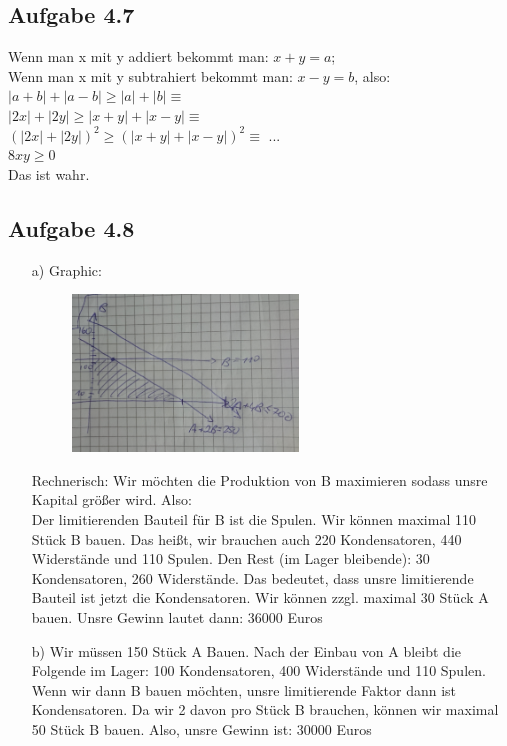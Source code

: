 \documentclass{standalone}
\begin{document}
\subsection{Aufgabe 4.7}
Wenn man x mit y addiert bekommt man: $x+y=a$;\\
Wenn man x mit y subtrahiert bekommt man: $x-y=b$, also:\\
$|a+b|+|a-b| \ge |a|+|b| \equiv $\\
$|2x|+|2y| \ge |x+y|+|x-y| \equiv$\\
$(|2x|+|2y|)^2 \ge (|x+y|+|x-y|)^2 \equiv$ ... \\
$ 8xy \ge 0$\\
Das ist wahr.

\subsection{Aufgabe 4.8}
\begin{itemize}
	\item[a)] Graphic: 
	\begin{figure}[htbp]
		\centering
		\includegraphics[width=6cm]{img/4_8_a}
	\end{figure}
	
	
	Rechnerisch: Wir möchten die Produktion von B maximieren sodass unsre Kapital größer wird. Also:\\
	
	Der limitierenden Bauteil für B ist die Spulen. Wir können maximal 110 Stück B bauen. Das heißt, wir brauchen auch 220 Kondensatoren, 440 Widerstände und 110 Spulen. Den Rest (im Lager bleibende): 30 Kondensatoren, 260 Widerstände. Das bedeutet, dass unsre limitierende Bauteil ist jetzt die Kondensatoren. Wir können zzgl. maximal 30 Stück A bauen. Unsre Gewinn lautet dann: 36000 Euros \\ 
	\item[b)] Wir müssen 150 Stück A Bauen. Nach der Einbau von A bleibt die Folgende im Lager: 100 Kondensatoren, 400 Widerstände und 110 Spulen. Wenn wir dann B bauen möchten, unsre limitierende Faktor dann ist Kondensatoren. Da wir 2 davon pro Stück B brauchen, können wir maximal 50 Stück B bauen. Also, unsre Gewinn ist: 30000 Euros\\
\end{itemize}
\end{document}
